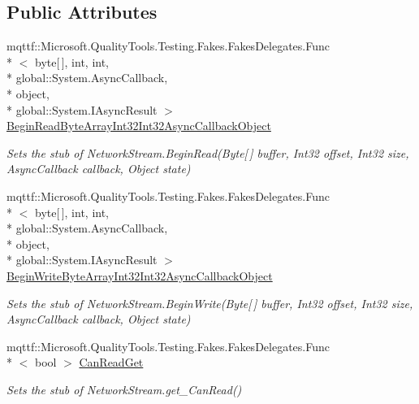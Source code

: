 \subsection*{Public Attributes}
\begin{DoxyCompactItemize}
\item 
mqttf\-::\-Microsoft.\-Quality\-Tools.\-Testing.\-Fakes.\-Fakes\-Delegates.\-Func\\*
$<$ byte\mbox{[}$\,$\mbox{]}, int, int, \\*
global\-::\-System.\-Async\-Callback, \\*
object, \\*
global\-::\-System.\-I\-Async\-Result $>$ \hyperlink{class_system_1_1_net_1_1_sockets_1_1_fakes_1_1_stub_network_stream_a18102cff97508f8c4dbfad5832794236}{Begin\-Read\-Byte\-Array\-Int32\-Int32\-Async\-Callback\-Object}
\begin{DoxyCompactList}\small\item\em Sets the stub of Network\-Stream.\-Begin\-Read(\-Byte\mbox{[}$\,$\mbox{]} buffer, Int32 offset, Int32 size, Async\-Callback callback, Object state)\end{DoxyCompactList}\item 
mqttf\-::\-Microsoft.\-Quality\-Tools.\-Testing.\-Fakes.\-Fakes\-Delegates.\-Func\\*
$<$ byte\mbox{[}$\,$\mbox{]}, int, int, \\*
global\-::\-System.\-Async\-Callback, \\*
object, \\*
global\-::\-System.\-I\-Async\-Result $>$ \hyperlink{class_system_1_1_net_1_1_sockets_1_1_fakes_1_1_stub_network_stream_a68fca711b667fe9aaa9bbf37269091ab}{Begin\-Write\-Byte\-Array\-Int32\-Int32\-Async\-Callback\-Object}
\begin{DoxyCompactList}\small\item\em Sets the stub of Network\-Stream.\-Begin\-Write(\-Byte\mbox{[}$\,$\mbox{]} buffer, Int32 offset, Int32 size, Async\-Callback callback, Object state)\end{DoxyCompactList}\item 
mqttf\-::\-Microsoft.\-Quality\-Tools.\-Testing.\-Fakes.\-Fakes\-Delegates.\-Func\\*
$<$ bool $>$ \hyperlink{class_system_1_1_net_1_1_sockets_1_1_fakes_1_1_stub_network_stream_ab7e6a252fd10048c802aba3848084a56}{Can\-Read\-Get}
\begin{DoxyCompactList}\small\item\em Sets the stub of Network\-Stream.\-get\-\_\-\-Can\-Read()\end{DoxyCompactList}\item 

\end{DoxyCompactItemize}
